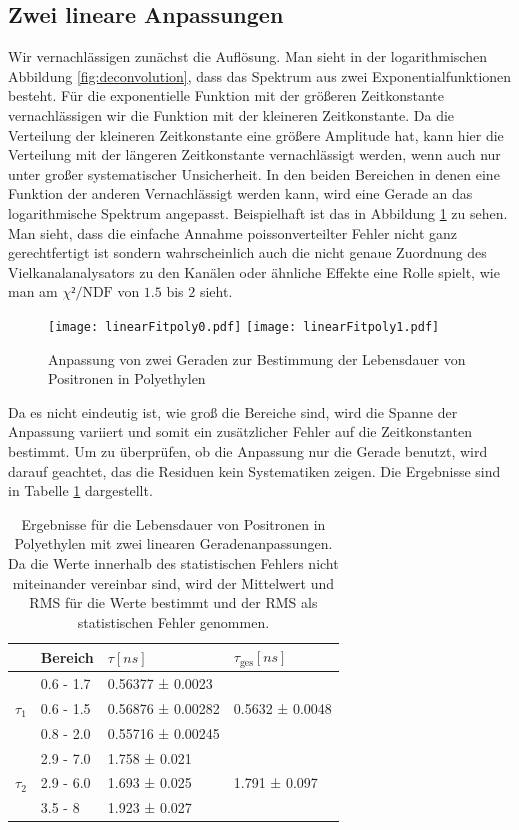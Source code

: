 \documentclass[a4paper,12pt]{article}
\begin{document}
\subsection{Zwei lineare Anpassungen}
Wir vernachlässigen zunächst die Auflösung.
Man sieht in der logarithmischen Abbildung \ref{fig:deconvolution}, dass das Spektrum aus zwei Exponentialfunktionen
besteht. Für die exponentielle Funktion mit der größeren Zeitkonstante vernachlässigen wir die
Funktion mit
der kleineren Zeitkonstante. Da die Verteilung der kleineren Zeitkonstante eine größere Amplitude
hat, kann hier die Verteilung mit der längeren Zeitkonstante vernachlässigt werden, wenn auch nur
unter großer systematischer Unsicherheit. In den beiden Bereichen in denen eine Funktion der anderen
Vernachlässigt werden kann, wird eine Gerade an das logarithmische Spektrum angepasst. Beispielhaft
ist das in Abbildung \ref{fig:dualLinearFit} zu sehen. Man sieht, dass die einfache Annahme
poissonverteilter Fehler nicht ganz gerechtfertigt ist sondern wahrscheinlich auch die nicht genaue
Zuordnung des Vielkanalanalysators zu den Kanälen oder ähnliche Effekte eine Rolle spielt, wie man
am $χ²/\text{NDF}$ von $1.5$ bis $2$ sieht.
\begin{figure}
	\texttt{[image: linearFitpoly0.pdf]}
	\texttt{[image: linearFitpoly1.pdf]}
	\caption{Anpassung von zwei Geraden zur Bestimmung der Lebensdauer von Positronen in Polyethylen}
	\label{fig:dualLinearFit}
\end{figure}

Da es nicht eindeutig ist, wie groß die Bereiche sind, wird die Spanne der
Anpassung variiert und somit ein zusätzlicher Fehler auf die Zeitkonstanten bestimmt.
Um zu überprüfen, ob die Anpassung nur die Gerade benutzt, wird darauf geachtet, das die Residuen
kein Systematiken zeigen.
Die Ergebnisse sind in Tabelle \ref{tab:linearPoly} dargestellt.

\begin{table}[h]
	\begin{tabular}{l |l l ||l}
			& Bereich & $τ [\si{ns}]$ & $τ_\text{ges} [\si{ns}]$ \\
		\hline
		\multirow{3}{*}{$τ_{1}$} &0.6 - 1.7&  0.56377 ± 0.0023  &\multirow{3}{*}{0.5632 ± 0.0048}\\
			 &0.6 - 1.5&  0.56876 ± 0.00282 &\\
			 &0.8 - 2.0&  0.55716 ± 0.00245 &\\
		\hline
		\multirow{3}{*}{$τ_2$} & 2.9 - 7.0 &  1.758 ± 0.021 &\multirow{3}{*}{1.791 ± 0.097}\\
			&2.9 - 6.0&  1.693 ± 0.025 & \\
			&3.5 - 8&  1.923 ± 0.027  &
	\end{tabular}
	\centering
	\caption{Ergebnisse für die Lebensdauer von Positronen in Polyethylen mit zwei linearen
		Geradenanpassungen. Da die Werte innerhalb des statistischen Fehlers nicht miteinander vereinbar sind, wird der Mittelwert und
	RMS für die Werte bestimmt und der RMS als statistischen Fehler genommen.}
	\label{tab:linearPoly}
\end{table}
\end{document}
